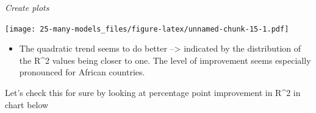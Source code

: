 \documentclass[]{book}
\newenvironment{Shaded}{\begin{snugshade}}{\end{snugshade}}
\newcommand{\DataTypeTok}[1]{\textcolor[rgb]{0.13,0.29,0.53}{#1}}
\newcommand{\KeywordTok}[1]{\textcolor[rgb]{0.13,0.29,0.53}{\textbf{#1}}}
\newcommand{\NormalTok}[1]{#1}
\newcommand{\OperatorTok}[1]{\textcolor[rgb]{0.81,0.36,0.00}{\textbf{#1}}}
\newcommand{\OtherTok}[1]{\textcolor[rgb]{0.56,0.35,0.01}{#1}}
\newcommand{\StringTok}[1]{\textcolor[rgb]{0.31,0.60,0.02}{#1}}
\providecommand{\tightlist}{%
  \setlength{\itemsep}{0pt}\setlength{\parskip}{0pt}}
\theoremstyle{definition}
\theoremstyle{definition}
\theoremstyle{definition}
\theoremstyle{remark}
\begin{document}
\begin{enumerate}
  \emph{Create plots}

\begin{Shaded}
\end{Shaded}

  \texttt{[image: 25-many-models\_files/figure-latex/unnamed-chunk-15-1.pdf]}

  \begin{itemize}
  \tightlist
  \item
    The quadratic trend seems to do better --\textgreater{} indicated by
    the distribution of the R\^{}2 values being closer to one. The level
    of improvement seems especially pronounced for African countries.
  \end{itemize}

  Let's check this for sure by looking at percentage point improvement
  in R\^{}2 in chart below


\end{enumerate}
\end{document}
